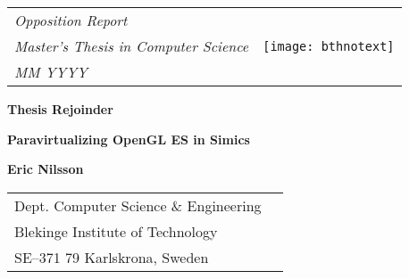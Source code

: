 
\newcommand{\logossize}{3cm}


{\pagestyle{empty}
\changepage{5cm}{1cm}{-0.5cm}{-0.5cm}{}{-2cm}{}{}{}
\noindent%
{\small
\begin{tabular}{p{} p{}}
\textit{Opposition Report}&\multirow{4}{*}{\texttt{[image: bthnotext]}}\\ %
\textit{Master's Thesis in Computer Science}\\
\textit{MM YYYY}\\ %
\end{tabular}}

\begin{center}
\par\vspace {7cm}
{\Huge\textbf{Thesis Rejoinder}} %
\par\vspace {0.5cm}
{\Large\textbf{Paravirtualizing OpenGL ES in Simics}} %
\par\vspace {3cm}
{\Large\textbf{Eric Nilsson}}
\par\vspace{0.5cm}
{\large\textit{\textbf{}}}
\par\vspace{0.5cm}
{\Large\textbf{}}
\par\vspace {6cm}
\end{center}

\noindent
{\small
	\begin{tabular}{p{} p{}}
	Dept. Computer Science \& Engineering&\multirow{4}{*}{}\\
	Blekinge Institute of Technology\\
	SE--371 79 Karlskrona, Sweden
	\end{tabular}}
\clearpage
}


